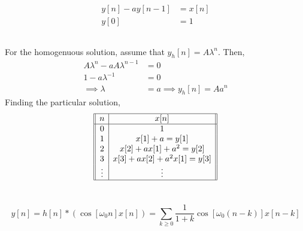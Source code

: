 \documentclass{article}
\begin{document}
\section{}

\begin{align}
    y[n] - ay[n - 1] &= x[n] \\
    y[0] &= 1
\end{align}

\subsection{}

For the homogenuous solution, assume that \(y_h[n] = A\lambda^n\).
Then,
\begin{align}
    A\lambda^n - aA\lambda^{n - 1} &= 0 \\
    1 - a\lambda^{-1} &= 0 \\
    \implies \lambda &= a
    \implies y_h[n] = Aa^n
\end{align}
Finding the particular solution,
\begin{equation}
    \begin{array}[]{||c|c||}
        \hline
        n & x[n] \\
        \hline
        0 & 1 \\
        1 & x[1] + a = y[1] \\
        2 & x[2] + a x[1] + a^2 = y[2] \\
        3 & x[3] + a x[2] + a^2 x[1] = y[3] \\
        \vdots & \vdots \\
        \hline
    \end{array}
\end{equation}


\subsection{}

\subsection{}

\section{}

\begin{equation}
    y[n] = h[n] \ast (\cos[\omega_0 n] x[n]) = \sum_{k \geqslant 0} \frac{1}{1 + k} \cos[\omega_0 (n - k)] x[n - k]
\end{equation}
\end{document}
